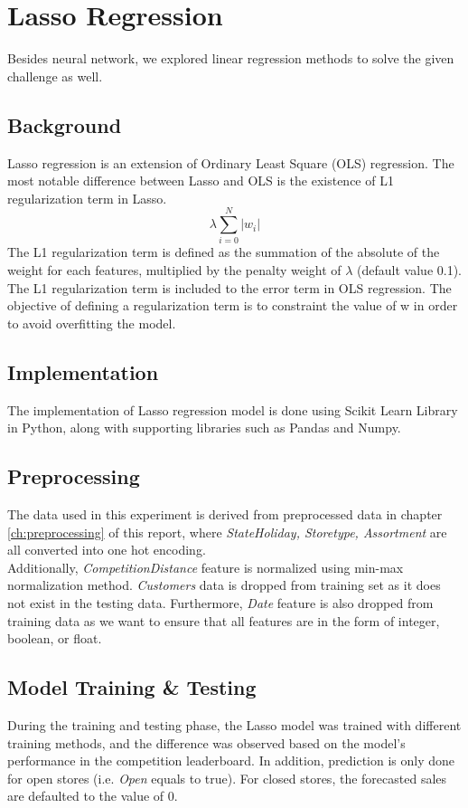\section{Lasso Regression} \label{sc:lasso}
Besides neural network, we explored linear regression methods to solve the given challenge as well.

\subsection{Background}
Lasso regression is an extension of Ordinary Least Square (OLS) regression. The most notable difference between Lasso and OLS is the existence of L1 regularization term in Lasso.
\begin{equation}
\label{eq:l1_regularization}
\lambda \sum_{i=0}^{N} |w_i|
\end{equation}
The L1 regularization term is defined as the summation of the absolute of the weight for each features, multiplied by the penalty weight of $\lambda$ (default value 0.1). The L1 regularization term is included to the error term in OLS regression. The objective of defining a regularization term is to constraint the value of w in order to avoid overfitting the model.

\subsection{Implementation}
The implementation of Lasso regression model is done using Scikit Learn Library in Python, along with supporting libraries such as Pandas and Numpy.

\subsection{Preprocessing}
The data used in this experiment is derived from preprocessed data in chapter \ref{ch:preprocessing} of this report, where \textit{StateHoliday, Storetype, Assortment} are all converted into one hot encoding.\\
Additionally, \textit{CompetitionDistance} feature is normalized using min-max normalization method. \textit{Customers} data is dropped from training set as it does not exist in the testing data. Furthermore, \textit{Date} feature is also dropped from training data as we want to ensure that all features are in the form of integer, boolean, or float.

\subsection{Model Training \& Testing}
During the training and testing phase, the Lasso model was trained with different training methods, and the difference was observed based on the model's performance in the competition leaderboard. In addition, prediction is only done for open stores (i.e. \textit{Open} equals to true). For closed stores, the forecasted sales are defaulted to the value of 0.

